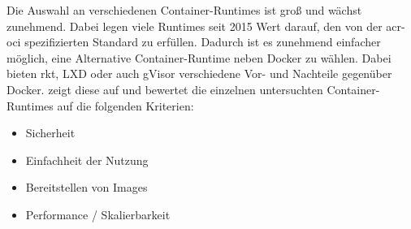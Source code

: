 Die Auswahl an verschiedenen Container-Runtimes ist groß und wächst zunehmend. Dabei legen viele Runtimes seit 2015 Wert darauf, den von der \gls{acr-oci} spezifizierten Standard zu erfüllen. Dadurch ist es zunehmend einfacher möglich, eine Alternative Container-Runtime neben Docker zu wählen. Dabei bieten rkt, LXD oder auch gVisor verschiedene Vor- und Nachteile gegenüber Docker.  zeigt diese auf und bewertet die einzelnen untersuchten Container-Runtimes auf die folgenden Kriterien: 
\begin{itemize}
	\item Sicherheit
	\item Einfachheit der Nutzung
	\item Bereitstellen von Images
	\item Performance / Skalierbarkeit
\end{itemize}

